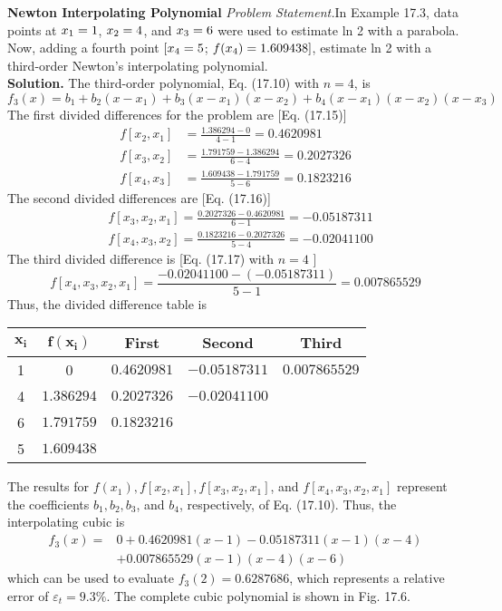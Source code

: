 \documentclass[../main.tex]{subfiles}
\begin{document}
    \begin{exmp} \textbf{Newton Interpolating Polynomial}
        \noindent\textit{Problem Statement.}In Example 17.3, data points at $x\textsubscript{1} = 1$, $x\textsubscript{2} = 4$, and $x\textsubscript{3} = 6$ were
        used to estimate ln 2 with a parabola. Now, adding a fourth point $[x\textsubscript{4} = 5$; $f (x\textsubscript{4}) = 1.609438]$, estimate ln 2 with a third-order Newton's interpolating polynomial.\\
        \noindent \textbf{Solution.} The third-order polynomial, Eq. (17.10) with $n=4$, is
        $$
        f_{3}(x)=b_{1}+b_{2}\left(x-x_{1}\right)+b_{3}\left(x-x_{1}\right)\left(x-x_{2}\right)+b_{4}\left(x-x_{1}\right)\left(x-x_{2}\right)\left(x-x_{3}\right)
        $$
        The first divided differences for the problem are [Eq. (17.15)]
        $$
        \begin{aligned}
        f\left[x_{2}, x_{1}\right] &=\frac{1.386294-0}{4-1}=0.4620981 \\
        f\left[x_{3}, x_{2}\right] &=\frac{1.791759-1.386294}{6-4}=0.2027326 \\
        f\left[x_{4}, x_{3}\right] &=\frac{1.609438-1.791759}{5-6}=0.1823216
        \end{aligned}
        $$
        The second divided differences are [Eq. (17.16)]
$$
\begin{aligned}
&f\left[x_{3}, x_{2}, x_{1}\right]=\frac{0.2027326-0.4620981}{6-1}=-0.05187311 \\
&f\left[x_{4}, x_{3}, x_{2}\right]=\frac{0.1823216-0.2027326}{5-4}=-0.02041100
\end{aligned}
$$
The third divided difference is [Eq. (17.17) with $n=4$ ]
$$
f\left[x_{4}, x_{3}, x_{2}, x_{1}\right]=\frac{-0.02041100-(-0.05187311)}{5-1}=0.007865529
$$
Thus, the divided difference table is
\begin{center}
\begin{tabular}{ccccc}
\hline $\boldsymbol{x}_{\boldsymbol{i}}$ & $\boldsymbol{f}\left(\boldsymbol{x}_{\boldsymbol{i}}\right)$ & First & Second & Third \\
\hline 1 & 0 & $0.4620981$ & $-0.05187311$ & $0.007865529$ \\
4 & $1.386294$ & $0.2027326$ & $-0.02041100$ & \\
6 & $1.791759$ & $0.1823216$ & & \\
5 & $1.609438$ & & & \\
\hline
\end{tabular}
\end{center}
The results for $f\left(x_{1}\right), f\left[x_{2}, x_{1}\right], f\left[x_{3}, x_{2}, x_{1}\right]$, and $f\left[x_{4}, x_{3}, x_{2}, x_{1}\right]$ represent the coefficients $b_{1}, b_{2}, b_{3}$, and $b_{4}$, respectively, of Eq. (17.10). Thus, the interpolating cubic is
$$
\begin{aligned}
f_{3}(x)=& 0+0.4620981(x-1)-0.05187311(x-1)(x-4) \\
&+0.007865529(x-1)(x-4)(x-6)
\end{aligned}
$$
which can be used to evaluate $f_{3}(2)=0.6287686$, which represents a relative error of $\varepsilon_{t}=9.3 \%$. The complete cubic polynomial is shown in Fig. 17.6.
    \end{exmp}
\end{document}
